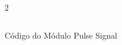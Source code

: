 \begin{figure}[H]
    \centering   
    \begin{tcolorbox}  
        \begin{multicols}{2} 
        \fontsize{9pt}{9pt}\selectfont\inputminted[obeytabs=true,tabsize=4,xleftmargin=20pt,linenos,breaklines]{VHDL}{VHDL/files/PulseSignal.vhd}    
        \end{multicols}
    \end{tcolorbox}   
    \caption{Código do Módulo Pulse Signal}
\end{figure}